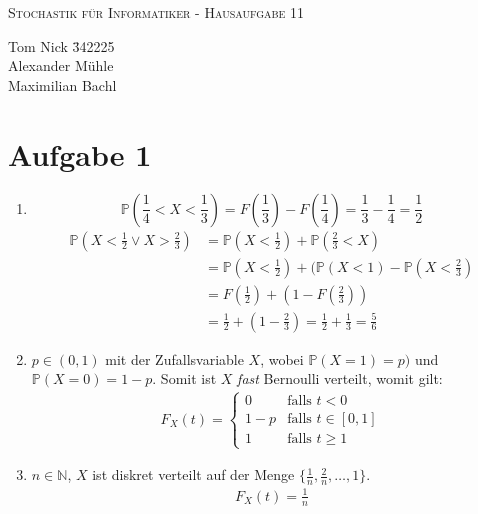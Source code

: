 \documentclass[10pt,a4paper,parskip=half]{scrartcl}
\newcommand{\N}{\mathbb{N}}
\newcommand{\PP}{\mathbb{P}}
\begin{document}
\begin{center}
\textsc{\Large{Stochastik für Informatiker - Hausaufgabe 11}} \\
\end{center}
\begin{tabbing}
Tom Nick \hspace{1.4cm}\= 342225\\
Alexander Mühle\\
Maximilian Bachl
\end{tabbing}

\section*{Aufgabe 1}
\begin{enumerate}
\item
$$\PP(\frac14 < X < \frac13) = F(\frac13) - F(\frac14) = \frac13 - \frac14 = \frac12$$
\begin{align*}
\PP(X < \frac12 \lor X > \frac23) &= \PP(X < \frac12) + \PP(\frac23 < X) \\
&= \PP(X < \frac12) + (\PP(X < 1) - \PP(X < \frac23) \\
&= F(\frac12) + (1 - F(\frac23)) \\
&= \frac12 + (1 - \frac23) = \frac12 + \frac13 = \frac56
\end{align*}
\item
$p \in (0,1)$ mit der Zufallsvariable $X$, wobei $\PP(X = 1) = p)$ und $\PP(X = 0) = 1 -p$. Somit ist $X$ \textit{fast} Bernoulli verteilt, womit gilt:
\begin{align*}
F_X(t) =
\begin{cases}
0 & \text{falls } t < 0 \\
1 - p &\text{falls } t \in [0,1] \\
1 &\text{falls } t \ge 1
\end{cases}
\end{align*}
\item
$n \in \N$, $X$ ist diskret verteilt auf der Menge $\{\frac1n, \frac2n, \dots ,1 \}$.
\begin{align*}
F_X(t) = \frac1n
\end{align*}
\end{enumerate}
\end{document}
